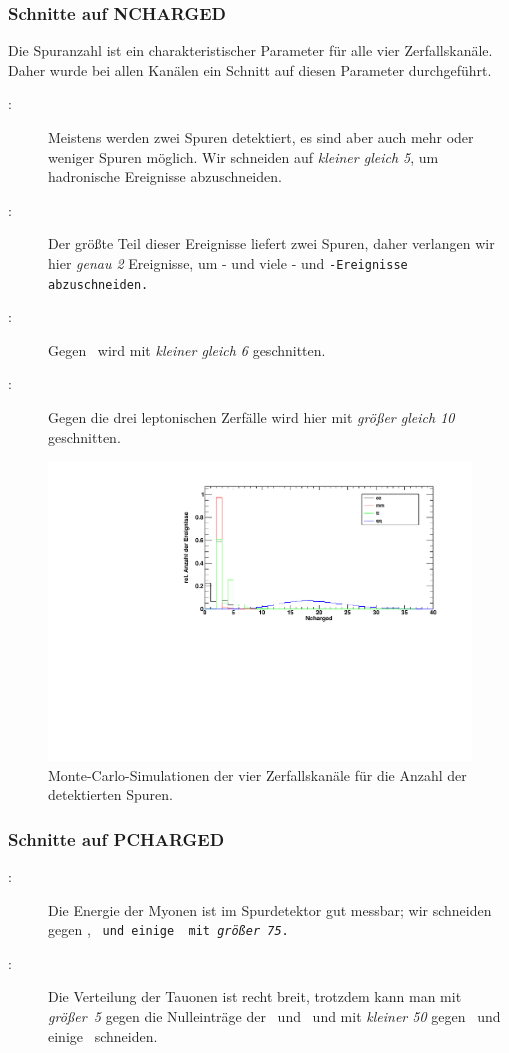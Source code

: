 \subsubsection*{Schnitte auf NCHARGED}
Die Spuranzahl ist ein charakteristischer Parameter für alle vier Zerfallskanäle.
Daher wurde bei allen Kanälen ein Schnitt auf diesen Parameter durchgeführt.
\begin{description}
\item[\Zee:] Meistens werden zwei Spuren detektiert, es sind aber auch mehr oder weniger Spuren
möglich. Wir schneiden auf \emph{kleiner gleich 5}, um hadronische Ereignisse abzuschneiden.
\item[\Zmm:] Der größte Teil dieser Ereignisse liefert zwei Spuren,
daher verlangen wir hier \emph{genau 2} Ereignisse, um \qq- und viele \ee- und \tt-Ereignisse abzuschneiden.
\item[\Ztt:] Gegen \qq\ wird mit \emph{kleiner gleich 6} geschnitten.
\item[\Zqq:] Gegen die drei leptonischen Zerfälle wird hier mit \emph{größer gleich 10} geschnitten.
\end{description}

\begin{figure}[H]
\begin{center}
  \includegraphics[width=\textwidth]{../img/dist_Ncharged.pdf}
  \caption{Monte-Carlo-Simulationen der vier Zerfallskanäle für die Anzahl der detektierten Spuren.}
  \label{img:dist_Ncharged}
\end{center}
\end{figure} 

\subsubsection*{Schnitte auf PCHARGED}
\begin{description}
\item[\Zmm:] Die Energie der Myonen ist im Spurdetektor gut messbar;
wir schneiden gegen \qq, \tt\ und einige \ee\ mit \emph{größer 75}.
\item[\Ztt:] Die Verteilung der Tauonen ist recht breit, trotzdem kann man mit \emph{größer~5}
gegen die Nulleinträge der \ee\ und \mm\ und mit \emph{kleiner 50} gegen \mm\ und einige \qq\ schneiden.
\end{description}


